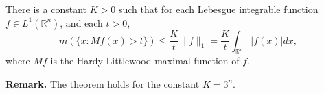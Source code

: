\documentclass[12pt]{article}
\begin{document}
There is a constant $K>0$ such that for each Lebesgue integrable function $f\in L^1(\mathbb{R}^n)$, and each $t>0$,
\[m(\{x:Mf(x)>t\}) \leq \frac{K}{t}\|f\|_1 = \frac{K}{t}\int_{\mathbb{R}^n} |f(x)|dx,\]
where $Mf$ is the Hardy-Littlewood maximal function of $f$.

\textbf{Remark.} The theorem holds for the constant $K=3^n$.
\end{document}
